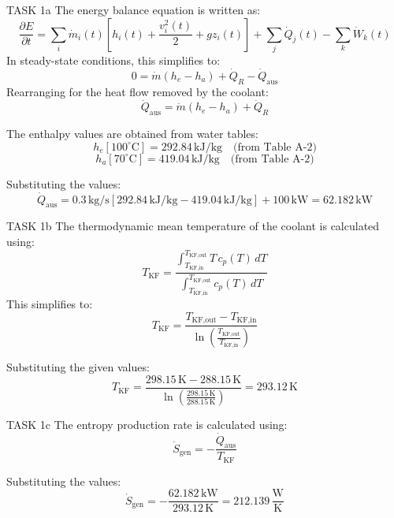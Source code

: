 TASK 1a  
The energy balance equation is written as:  
\[
\frac{\partial E}{\partial t} = \sum_i \dot{m}_i(t) \left[ h_i(t) + \frac{v_i^2(t)}{2} + g z_i(t) \right] + \sum_j \dot{Q}_j(t) - \sum_k \dot{W}_k(t)
\]  
In steady-state conditions, this simplifies to:  
\[
0 = \dot{m} (h_e - h_a) + \dot{Q}_R - \dot{Q}_{\text{aus}}
\]  
Rearranging for the heat flow removed by the coolant:  
\[
\dot{Q}_{\text{aus}} = \dot{m} (h_e - h_a) + \dot{Q}_R
\]  

The enthalpy values are obtained from water tables:  
\[
h_e[100^\circ\text{C}] = 292.84 \, \text{kJ/kg} \quad \text{(from Table A-2)}
\]  
\[
h_a[70^\circ\text{C}] = 419.04 \, \text{kJ/kg} \quad \text{(from Table A-2)}
\]  

Substituting the values:  
\[
\dot{Q}_{\text{aus}} = 0.3 \, \text{kg/s} \left[ 292.84 \, \text{kJ/kg} - 419.04 \, \text{kJ/kg} \right] + 100 \, \text{kW} = 62.182 \, \text{kW}
\]  

TASK 1b  
The thermodynamic mean temperature of the coolant is calculated using:  
\[
T_{\text{KF}} = \frac{\int_{T_{\text{KF,in}}}^{T_{\text{KF,out}}} T \, c_p(T) \, dT}{\int_{T_{\text{KF,in}}}^{T_{\text{KF,out}}} c_p(T) \, dT}
\]  
This simplifies to:  
\[
T_{\text{KF}} = \frac{T_{\text{KF,out}} - T_{\text{KF,in}}}{\ln \left( \frac{T_{\text{KF,out}}}{T_{\text{KF,in}}} \right)}
\]  

Substituting the given values:  
\[
T_{\text{KF}} = \frac{298.15 \, \text{K} - 288.15 \, \text{K}}{\ln \left( \frac{298.15 \, \text{K}}{288.15 \, \text{K}} \right)} = 293.12 \, \text{K}
\]  

TASK 1c  
The entropy production rate is calculated using:  
\[
\dot{S}_{\text{gen}} = -\frac{\dot{Q}_{\text{aus}}}{T_{\text{KF}}}
\]  

Substituting the values:  
\[
\dot{S}_{\text{gen}} = -\frac{62.182 \, \text{kW}}{293.12 \, \text{K}} = 212.139 \, \frac{\text{W}}{\text{K}}
\]